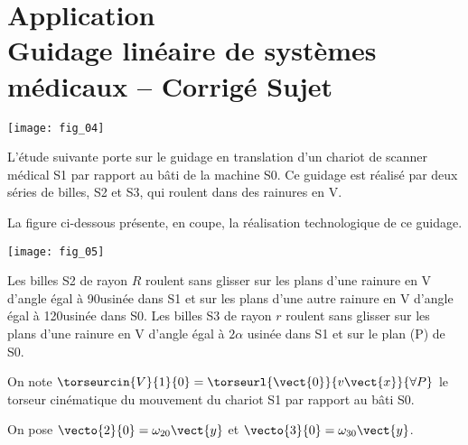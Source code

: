 \chapter*{Application  \\ 
Guidage linéaire de systèmes médicaux -- \ifprof Corrigé \else Sujet \fi}

\iflivret {} \else
\ifprof  {} \else \fi
\fi

\setcounter{question}{0}

\marginnote[1cm]{
}



\begin{marginfigure}
\texttt{[image: fig\_04]}
\end{marginfigure}

L’étude suivante porte sur le guidage en translation d’un chariot 
de scanner médical S1 par rapport au bâti de la machine S0. Ce 
guidage est réalisé par deux séries de billes, S2 et S3, qui roulent 
dans des rainures en V. 

La figure ci-dessous présente, en coupe, la réalisation technologique de ce guidage. 

\begin{center}
\texttt{[image: fig\_05]}
\end{center}

Les billes S2 de rayon $R$ roulent sans glisser sur les plans d’une rainure en V d’angle égal à 90\textdegree usinée dans 
S1 et sur les plans d’une autre rainure en V d’angle égal à 120\textdegree usinée dans S0. 
Les billes S3 de rayon $r$ roulent sans glisser sur les plans d’une rainure en V d’angle égal à 
$2\alpha$ usinée dans 
S1 et sur le plan (P) de S0. 

On note $\torseurcin{V}{1}{0}=\torseurl{\vect{0}}{v\vect{x}}{\forall P}$ le torseur cinématique du mouvement du chariot S1 par rapport au bâti S0. 

On pose $\vecto{2}{0} = \omega_{20}\vect{y}$ et $\vecto{3}{0} = \omega_{30}\vect{y}$.

